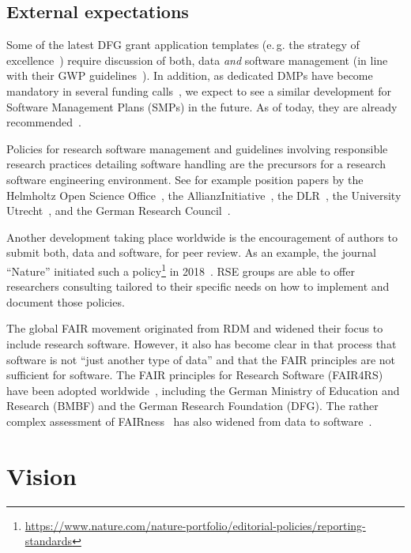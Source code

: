 \documentclass[a4paper]{article}
\makeatletter
\newcommand*{\eg}{e.\,g.\@\xspace}
\makeatother
\begin{document}
\subsection{External expectations}

Some of the latest DFG grant application templates (\eg{} the strategy of excellence~\autocite{DFG_ExStra130}) require discussion of both, data \emph{and} software management (in line with their GWP guidelines~\autocite{dfg_gsp}).
In addition, as dedicated DMPs have become mandatory in several funding calls~\autocite{FDM_Info_FDM},
we expect to see a similar development for Software Management Plans (SMPs) in the future. As of today, they are already recommended~\autocite{FDM_Info_SMP}.

Policies for research software management and guidelines involving responsible research practices detailing software handling are the precursors for a research software engineering environment.
See for example position papers by the Helmholtz Open Science Office~\autocite{Helmholtz2019a,Helmholtz2019b},
the AllianzInitiative~\autocite{Konrad2021},
the DLR~\autocite{Schlauch2018b},
the University Utrecht~\autocite{Utrecht2016b},
and the German Research Council~\autocite{dfg_gsp}.

Another development taking place worldwide is the encouragement of authors to submit both, data and software, for peer review.
As an example, the journal “Nature” initiated such a policy\footnote{\url{https://www.nature.com/nature-portfolio/editorial-policies/reporting-standards}} in 2018~\autocite{Nature2018}.
RSE groups are able to offer researchers consulting tailored to their specific needs on how to implement and document those policies.

The global FAIR movement originated from RDM and widened their focus to include research software.
However, it also has become clear in that process that software is not “just another type of data” and that the FAIR principles are not sufficient for software.
The FAIR principles for Research Software (FAIR4RS)~\autocite{ChueHong2022} have been adopted worldwide~\autocite{Barker2024}, including the German Ministry of Education and Research (BMBF) and the German Research Foundation (DFG).
The rather complex assessment of FAIRness~\autocite{Wilkinson2023,FAIRmaturity} has also widened from data to software~\autocite{Lamprecht2020}.

\section{Vision}%
\label{sec:vision}
\end{document}
